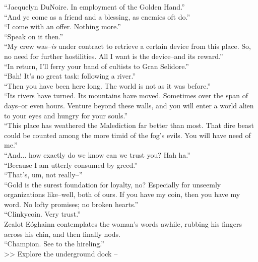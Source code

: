 “Jacquelyn DuNoire. In employment of the Golden Hand.”\\

“And ye come as a friend and a blessing, as enemies oft do.”\\

“I come with an offer. Nothing more.”\\

“Speak on it then.”\\

“My crew was--\emph{is} under contract to retrieve a certain device from this place. So, no need for further hostilities. All I want is the device--and its reward.”\\

“In return, I’ll ferry your band of cultists to Gran Selidore.”\\

“Bah! It’s no great task: following a river.”\\

“Then you have been here long. The world is not as it was before.”\\

“Its rivers have turned. Its mountains have moved. Sometimes over the span of days--or even hours. Venture beyond these walls, and you will enter a world alien to your eyes and hungry for your souls.”\\

“This place has weathered the Malediction far better than most. That dire beast could be counted among the more timid of the fog’s evils. You will have need of me.”\\

“And... how exactly do we know can we trust you? Hah ha.”\\

“Because I am utterly consumed by greed.”\\

“That’s, um, not really--”\\

“Gold is the surest foundation for loyalty, no? Especially for unseemly organizations like--well, both of ours. If you have my coin, then you have my word. No lofty promises; no broken hearts.”\\

“Clinkycoin. Very trust.”\\

Zealot Eóghainn contemplates the woman’s words awhile, rubbing his fingers across his chin, and then finally nods.\\

“Champion. See to the hireling.”\\

>> Explore the underground dock -- 
